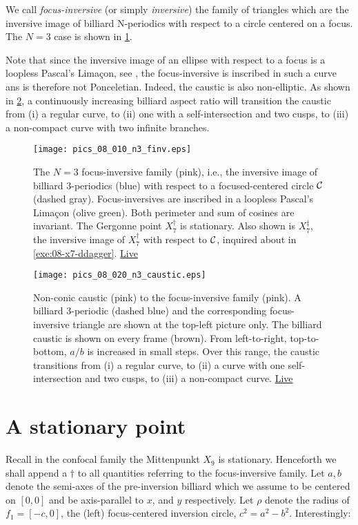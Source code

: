 We call {\em focus-inversive} (or simply {\em inversive}) the family of triangles which are the inversive image of billiard N-periodics with respect to a circle centered on a focus. The $N=3$ case is shown in \cref{fig:08-n3-finv}.

Note that since the inversive image of an ellipse with respect to a focus is a loopless Pascal's Limaçon, see \cite{mw}, the focus-inversive is inscribed in such a curve ans is therefore not Ponceletian. Indeed, the caustic is also non-elliptic. As shown in \cref{fig:08-n3-caustics}, a continuously increasing billiard aspect ratio will transition the caustic from (i) a regular curve, to (ii) one with a self-intersection and two cusps, to (iii) a non-compact curve with two infinite branches.

\begin{figure}
    \centering
    \texttt{[image: pics\_08\_010\_n3\_finv.eps]}
    \caption{The $N=3$ focus-inversive family (pink), i.e., the inversive image of billiard 3-periodics (blue) with respect to a focused-centered circle $\mathcal{C}$ (dashed gray). Focus-inversives are inscribed in a loopless Pascal's Limaçon (olive green). Both perimeter and sum of cosines are invariant. The Gergonne point $X_7^\dagger$ is stationary. Also shown is $X_7^\ddagger$, the inversive image of $X_7^\dagger$ with respect to $\mathcal{C}$, inquired about in \cref{exe:08-x7-ddagger}. \href{https://bit.ly/3i19g6Q}{Live}}
    \label{fig:08-n3-finv}
\end{figure}

\begin{figure}
    \centering
    \texttt{[image: pics\_08\_020\_n3\_caustic.eps]}
    \caption{Non-conic caustic (pink) to the focus-inversive family (pink). A billiard 3-periodic (dashed blue) and the corresponding focus-inversive triangle are shown at the top-left picture only. The billiard caustic is shown on every frame (brown). From left-to-right, top-to-bottom, $a/b$ is increased in small steps. Over this range, the caustic transitions from (i) a regular curve, to (ii) a curve with one self-intersection and two cusps, to (iii) a non-compact curve.  \href{https://bit.ly/374jbBl}{Live}}
    \label{fig:08-n3-caustics}
\end{figure}

\section{A stationary point}

Recall in the confocal family the Mittenpunkt $X_9$ is stationary. Henceforth we shall append a $\dagger$ to all quantities referring to the focus-inversive family. Let $a,b$ denote the semi-axes of the pre-inversion billiard which we assume to be centered on $[0,0]$ and be axis-parallel to $x$, and $y$ respectively. Let $\rho$ denote the radius of $f_1=[-c,0]$, the (left) focus-centered inversion circle, $c^2=a^2-b^2$. Interestingly:

